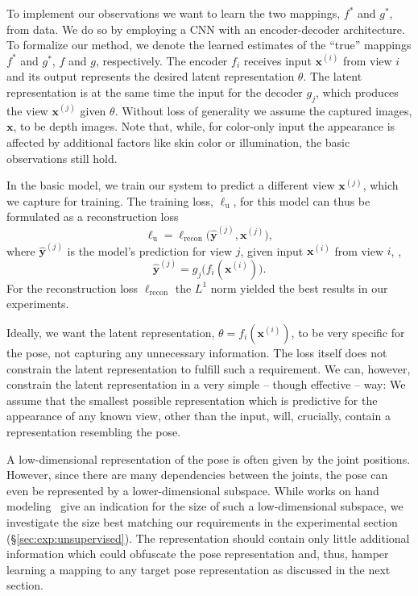 \documentclass[10pt,twocolumn,letterpaper]{article}
\begin{document}
To implement our observations we want to learn the two mappings, 
$f^{\ast}$ and $g^{\ast}$, from data.
We do so by employing a \ac{CNN} with an encoder-decoder architecture.
To formalize our method, 
we denote the learned estimates of the ``true'' mappings $f^{\ast}$ and $g^{\ast}$, 
$f$ and $g$, respectively.
The encoder $f_{i}$ receives input $\mathbf{x}^{(i)}$ from view $i$ 
and its output represents the desired latent representation $\theta$.
The latent representation is at the same time the input for the decoder $g_{j}$, 
which produces the view $\mathbf{x}^{(j)}$ given $\theta$.
Without loss of generality we assume the captured images, $\mathbf{x}$, to be depth images.
Note that, while, for color-only input the appearance is affected by
additional factors like skin color or illumination, 
the basic observations still hold.

In the basic model, we train our system to predict a 
different view $\mathbf{x}^{(j)}$, which we capture for training.
The training loss, $\ell_{\mathrm{u}}$, for this model can thus be formulated as 
a reconstruction loss
\begin{equation}
 \ell_{\mathrm{u}} = \ell_{\mathrm{recon}} \big( \mathbf{\hat{y}}^{(j)}, \mathbf{x}^{(j)} \big),
\end{equation}
where $\mathbf{\hat{y}}^{(j)}$ is the model's prediction for view $j$, given input 
$\mathbf{x}^{(i)}$ from 
view $i$, \ie,
\begin{equation}
 \mathbf{\hat{y}}^{(j)} = g_{j}\big( f_{i} ( \mathbf{x}^{(i)} ) \big).
\end{equation}
For the reconstruction loss $\ell_{\mathrm{recon}}$ the $L^{1}$ norm 
yielded the best results in our experiments.

Ideally, we want the latent representation, $\theta = f_{i} ( \mathbf{x}^{(i)} )$,
to be very specific for the pose, 
not capturing any unnecessary information.
The loss itself does not constrain the latent representation
to fulfill such a requirement.
We can, however, constrain the latent representation 
in a very simple -- though effective -- way:
We assume that the smallest possible representation which is 
predictive for the appearance of any known view, other than the input,
will, crucially, contain a representation resembling the pose.

A low-dimensional representation of the pose is often given by the joint positions.
However, since there are many dependencies between the joints, 
the pose can even be represented by a lower-dimensional subspace.
While works on hand modeling~\cite{Albrecht03handmodels,Lin2000_handconstraints}
give an indication for the size of such a low-dimensional subspace,
we investigate the size best matching our requirements 
in the experimental section (\S\ref{sec:exp:unsupervised}).
The representation should contain only little additional information 
which could obfuscate the pose representation and, 
thus, hamper learning a mapping to any target pose representation 
as discussed in the next section.
\end{document}
